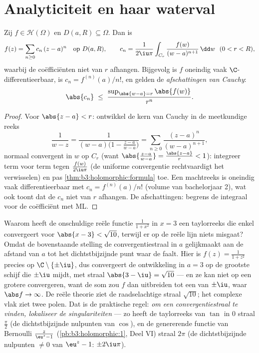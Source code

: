 \section{Analyticiteit en haar waterval}

\begin{theorem}[Holomorf $=$ analytisch]
\label{thm:b3:holomorphic:analytic}
Zij $f \in \mathcal H(\Omega)$ en $D(a, R) \subseteq \Omega$. Dan
is
\[
f(z) = \sum_{n\geq0}c_n\,(z - a)^n \quad \text{op } D(a, R),
\qquad
c_n = \frac1{2\iu\pi}\int_{C_r}\frac{f(w)}{(w -
a)^{n+1}}\,\dd w \ \ (0 < r < R),
\]
waarbij de coëfficiënten niet van $r$ afhangen. Bijgevolg is $f$
oneindig vaak $\C$-differentieerbaar, is $c_n = f^{(n)}(a)/n!$,
en gelden de \emph{afschattingen van
Cauchy}:
\[
\abs{c_n} \;\leq\; \frac{\sup_{\abs{w - a} =
r}\abs{f(w)}}{r^{n}} .
\]
\end{theorem}

\begin{proof}
Voor $\abs{z - a} < r$: ontwikkel de kern van Cauchy in de
meetkundige reeks
\[
\frac1{w - z} = \frac1{(w - a)\bigl(1 - \frac{z - a}{w -
a}\bigr)} = \sum_{n\geq0}\frac{(z - a)^n}{(w - a)^{n+1}},
\]
normaal convergent in $w$ op $C_r$ (want $\abs{\frac{z-a}{w-a}} =
\frac{\abs{z-a}}r < 1$): integreer term voor term tegen
$\frac{f(w)}{2\iu\pi}$ (de uniforme convergentie rechtvaardigt
het verwisselen) en pas \cref{thm:b3:holomorphic:formula} toe.
Een machtreeks is oneindig vaak differentieerbaar met $c_n =
f^{(n)}(a)/n!$ (volume van bachelorjaar 2), wat ook toont dat de
$c_n$ niet van $r$ afhangen. De afschattingen: begrens de
integraal voor de coëfficiënt met ML.
\end{proof}

\begin{example}
\label{ex:b3:holomorphic:radius}
Waarom heeft de onschuldige reële functie $\frac1{1 + x^2}$ in $x
= 3$ een taylorreeks die enkel convergeert voor $\abs{x - 3} <
\sqrt{10}$, terwijl er op de reële lijn niets misgaat? Omdat de
bovenstaande stelling de convergentiestraal in $a$ gelijkmaakt
aan de afstand van $a$ tot het dichtstbijzijnde punt waar de
 faalt. Hier is $f(z) = \frac1{1 + z^2}$ precies
 op $\C\setminus\{\pm\iu\}$, dus convergeert de
ontwikkeling in $a = 3$ op de grootste schijf die $\pm\iu$
mijdt, met straal $\abs{3 - \iu} = \sqrt{10}$ --- en ze kan niet
op een grotere convergeren, want de som zou $f$ dan 
uitbreiden tot een  van $\pm\iu$, waar $\abs f \to
\infty$. De reële theorie ziet de raadselachtige straal
$\sqrt{10}$; het complexe vlak ziet twee polen. Dat is de
praktische regel: \emph{om een convergentiestraal te vinden,
lokaliseer de singulariteiten} --- zo heeft de taylorreeks van
$\tan$ in $0$ straal $\frac\pi2$ (de dichtstbijzijnde nulpunten
van $\cos$), en de genererende functie van Bernoulli $\frac
z{\eu^z - 1}$ (\cref{pb:b3:holomorphic:1}, Deel VI) straal $2\pi$
(de dichtstbijzijnde nulpunten $\neq 0$ van $\eu^z - 1$:
$\pm2\iu\pi$).
\end{example}

